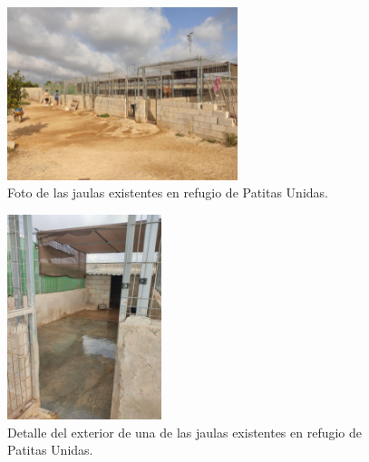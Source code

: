 \documentclass[12pt]{article}
\begin{document}
	\pagebreak

	\begin{figure}[h!]
		\begin{center}
			\includegraphics[width=0.6\textwidth]{img/refugio_jaulas.jpg}
			\caption{Foto de las jaulas existentes en refugio de Patitas Unidas.}
			\label{Foto jaulas refugio}
		\end{center}
	\end{figure}
	
	
	\begin{figure}[h!]
		\begin{center}
			\includegraphics[width=0.4\textwidth]{img/refugio_jaulas_detalleExterior.jpg}
			\caption{Detalle del exterior de una de las jaulas existentes en refugio de Patitas Unidas.}
			\label{Foto jaulas refugio detalle exterior}
		\end{center}
	\end{figure}
	
	\pagebreak
	
\end{document}
